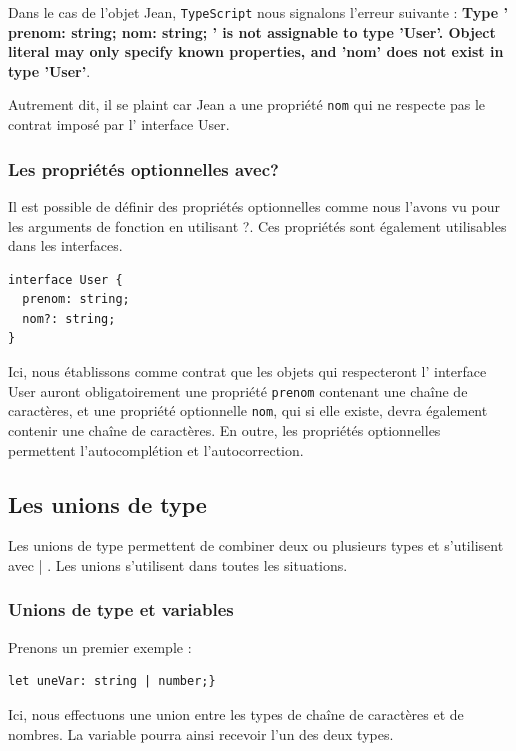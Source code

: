 \documentclass{article}
\begin{document}
Dans le cas de l'objet {\color{blue} Jean}, {\tt TypeScript} nous signalons l'erreur suivante : {\bf Type '{ prenom: string; nom: string; }' is not assignable to type 'User'. Object literal may only specify known properties, and 'nom' does not exist in type 'User'}.

Autrement dit, il se plaint car {\color{blue} Jean} a une propriété {\tt nom} qui ne respecte pas le contrat imposé par l' interface {\color{monOrange} User}.

\subsubsection{Les propriétés optionnelles avec?}
Il est possible de définir des propriétés optionnelles comme nous l'avons vu pour les arguments de fonction en utilisant {\color{monOrange} ?}. Ces propriétés sont également utilisables dans les interfaces.
\begin{verbatim}
interface User {
  prenom: string;
  nom?: string;
}
\end{verbatim}

Ici, nous établissons comme contrat que les objets qui respecteront l' {\color{monOrange}interface User} auront obligatoirement une propriété {\tt prenom} contenant une chaîne de caractères, et une propriété optionnelle {\tt nom}, qui si elle existe, devra également contenir une chaîne de caractères. En outre, les propriétés optionnelles permettent l'autocomplétion et l'autocorrection.

\subsection{Les unions de type}
Les unions de type permettent de combiner deux ou plusieurs types et s'utilisent avec {\color{monOrange}|} . Les unions s'utilisent dans toutes les situations.

\subsubsection{Unions de type et variables}
Prenons un premier exemple :
\begin{verbatim}
let uneVar: string | number;}
\end{verbatim}

Ici, nous effectuons une union entre les types de chaîne de caractères et de nombres. La variable pourra ainsi recevoir l'un des deux types.
\end{document}

